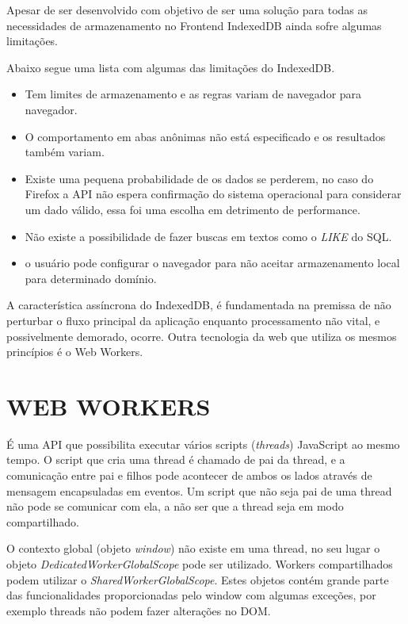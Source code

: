 Apesar de ser desenvolvido com objetivo de ser uma solução para todas
as necessidades de armazenamento no Frontend IndexedDB ainda sofre
algumas limitações.

Abaixo segue uma lista com algumas das limitações do IndexedDB.

\begin{itemize}
\item Tem limites de armazenamento e as regras variam de navegador para navegador.
\item O comportamento em abas anônimas não está especificado e os resultados também variam.
\item Existe uma pequena probabilidade de os dados se perderem, no caso do Firefox a API não espera confirmação do sistema operacional para considerar um dado válido, essa foi uma escolha em detrimento de performance.
\item Não existe a possibilidade de fazer buscas em textos como o \textit{LIKE} do SQL.
\item o usuário pode configurar o navegador para não aceitar armazenamento local para determinado domínio.
\end{itemize}


A característica assíncrona do IndexedDB, é fundamentada na
premissa de não perturbar o fluxo principal da aplicação enquanto
processamento não vital, e possivelmente demorado, ocorre. Outra
tecnologia da web que utiliza os mesmos princípios é o Web Workers.

\section{WEB WORKERS}

É uma API que possibilita executar vários scripts
(\textit{threads}) JavaScript ao mesmo tempo. O script que cria uma
thread é chamado de pai da thread, e a comunicação entre pai e filhos
pode acontecer de ambos os lados através de mensagem encapsuladas
em eventos. Um script que não seja pai de uma thread não pode se
comunicar com ela, a não ser que a thread seja em modo compartilhado.

O contexto global (objeto \textit{window}) não existe em uma
thread, no seu lugar o objeto \textit{DedicatedWorkerGlobalScope}
pode ser utilizado. Workers compartilhados podem utilizar o
\textit{SharedWorkerGlobalScope}. Estes objetos contém grande parte das
funcionalidades proporcionadas pelo window com algumas exceções, por
exemplo threads não podem fazer alterações no DOM.

